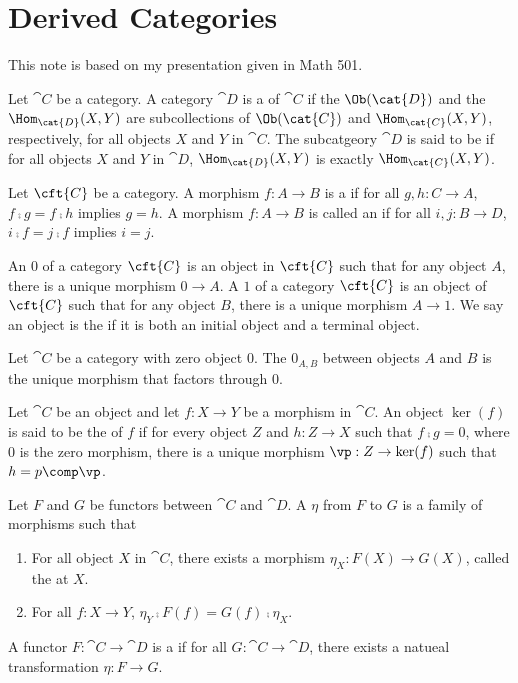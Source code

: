 \pagebreak
\section{Derived Categories}
\par
This note is based on my presentation given in Math 501.
\begin{definition}
    Let $\cat{C}$ be a category. A category $\cat{D}$ is a  of $\cat{C}$ if the $\Ob(\cat{D})$ and the ${\Hom}_{\cat{D}}(X,Y)$ are subcollections of $\Ob(\cat{C})$ and ${\Hom}_{\cat{C}}(X,Y)$, respectively, for all objects $X$ and $Y$ in $\cat{C}$. The subcatgeory $\cat{D}$ is said to be  if for all objects $X$ and $Y$ in $\cat{D}$, ${\Hom}_{\cat{D}}(X,Y)$ is exactly ${\Hom}_{\cat{C}}(X,Y)$.
\end{definition}
\begin{definition}
    Let $\cft{C}$ be a category. A morphism $f:A\to B$ is a  if for all $g,h:C\to A$, $f\comp g=f\comp h$ implies $g=h$. A morphism $f:A\to B$ is called an  if for all $i,j:B\to D$, $i\comp f=j\comp f$ implies $i=j$.
\end{definition}
\begin{definition}
    An  $0$ of a category $\cft{C}$ is an object in $\cft{C}$ such that for any object $A$, there is a unique morphism $0\to A$. A  $1$ of a category $\cft{C}$ is an object of $\cft{C}$ such that for any object $B$, there is a unique morphism $A\to 1$. We say an object is the  if it is both an initial object and a terminal object.
\end{definition}
\begin{definition}
    Let $\cat{C}$ be a category with zero object 0. The  ${0}_{A,B}$ between objects $A$ and $B$ is the unique morphism that factors through 0.
\end{definition}
\begin{definition}
    Let $\cat{C}$ be an object and let $f:X\to Y$ be a morphism in $\cat{C}$. An object $\ker(f)$ is said to be the  of $f$ if for every object $Z$ and $h:Z\to X$ such that $f\comp g=0$, where $0$ is the zero morphism, there is a unique morphism $\vp:Z\to\ker(f)$ such that $h=p\comp\vp$.
\end{definition}
\begin{definition}
    Let $F$ and $G$ be functors between $\cat{C}$ and $\cat{D}$. A  $\eta$ from $F$ to $G$ is a family of morphisms such that
    \begin{enumerate}
        \item For all object $X$ in $\cat{C}$, there exists a morphism ${\eta}_{X}:F(X)\to G(X)$, called the  at $X$.
        \item For all $f:X\to Y$, ${\eta}_{Y}\comp F(f)=G(f)\comp{\eta}_{X}$.
    \end{enumerate}
    A functor $F:\cat{C}\to\cat{D}$ is a  if for all $G:\cat{C}\to\cat{D}$, there exists a natueal transformation $\eta:F\to G$.
\end{definition}
